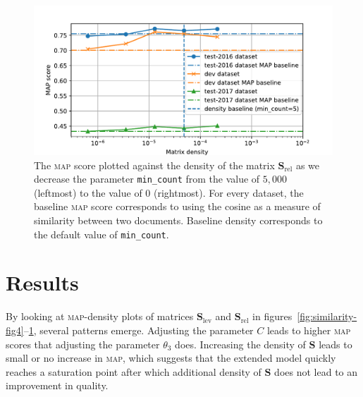 \documentclass[
  digital, %
  notable, %
  lof,     %
  lot,     %
  nopalatino, color
]{fithesis3}
\def\abbr#1{\textsc{\MakeLowercase{#1}}}
\begin{document}
\begin{figure}[tb]
\centering%
\includegraphics[trim={0.6cm 0.1cm 1.5cm 1.0cm}, scale=0.75]{figs/fig1}
\caption[A \abbr{MAP}-density plot for matrix $\mathbf S_{\textrm{rel}}$
and parameter \texttt{min\_count}]{The
  \abbr{MAP}\index{map@\protect\abbr{MAP}} score plotted against the density of
  the matrix $\mathbf S_{\textrm{rel}}$
  as we decrease the parameter
  \texttt{min\_count} from the value of
  $5{,}000$ (leftmost) to the value of $0$ (rightmost). For every
  dataset, the baseline \abbr{MAP} score corresponds to using the cosine as a
  measure of similarity between two documents. Baseline density corresponds to
  the default value of \texttt{min\_count}.}
  \label{fig:similarity-fig1}
\end{figure}

\section{Results}
\label{sec:similarity-results}
By looking at \abbr{MAP}\index{map@\abbr {MAP}}-density plots of matrices
$\mathbf S_{\textrm{lev}}$ and $\mathbf S_{\textrm{rel}}$
in figures~\ref{fig:similarity-fig4}--\ref{fig:similarity-fig1},
several patterns emerge. Adjusting the parameter $C$ leads to
higher \abbr{MAP} scores that adjusting the parameter
$\theta_3$ does. Increasing the density of $\mathbf
S$ leads to small or no increase in \abbr{MAP}, which
suggests that the extended model quickly reaches
a saturation point after which additional density of $\mathbf S$ does not lead
to an improvement in quality.
\end{document}
